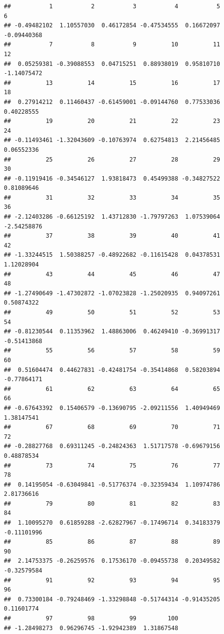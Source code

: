 \documentclass[
]{book}
\begin{document}
\begin{verbatim}
##           1           2           3           4           5           6 
## -0.49482102  1.10557030  0.46172854 -0.47534555  0.16672097 -0.09440368 
##           7           8           9          10          11          12 
##  0.05259381 -0.39088553  0.04715251  0.88938019  0.95810710 -1.14075472 
##          13          14          15          16          17          18 
##  0.27914212  0.11460437 -0.61459001 -0.09144760  0.77533036  0.40228555 
##          19          20          21          22          23          24 
## -0.11493461 -1.32043609 -0.10763974  0.62754813  2.21456485  0.06552336 
##          25          26          27          28          29          30 
## -0.11919416 -0.34546127  1.93818473  0.45499388 -0.34827522  0.81089646 
##          31          32          33          34          35          36 
## -2.12403286 -0.66125192  1.43712830 -1.79797263  1.07539064 -2.54258876 
##          37          38          39          40          41          42 
## -1.33244515  1.50388257 -0.48922682 -0.11615428  0.04378531  1.12028904 
##          43          44          45          46          47          48 
## -1.27490649 -1.47302872 -1.07023828 -1.25020935  0.94097261  0.50874322 
##          49          50          51          52          53          54 
## -0.81230544  0.11353962  1.48863006  0.46249410 -0.36991317 -0.51413868 
##          55          56          57          58          59          60 
##  0.51604474  0.44627831 -0.42481754 -0.35414868  0.58203894 -0.77864171 
##          61          62          63          64          65          66 
## -0.67643392  0.15406579 -0.13690795 -2.09211556  1.40949469  1.38147541 
##          67          68          69          70          71          72 
## -0.28827768  0.69311245 -0.24824363  1.51717578 -0.69679156  0.48878534 
##          73          74          75          76          77          78 
##  0.14195054 -0.63049841 -0.51776374 -0.32359434  1.10974786  2.81736616 
##          79          80          81          82          83          84 
##  1.10095270  0.61859288 -2.62827967 -0.17496714  0.34183379 -0.11101996 
##          85          86          87          88          89          90 
##  2.14753375 -0.26259576  0.17536170 -0.09455738  0.20349582 -0.32579584 
##          91          92          93          94          95          96 
##  0.73300184 -0.79248469 -1.33298848 -0.51744314 -0.91435205  0.11601774 
##          97          98          99         100 
## -1.28498273  0.96296745 -1.92942389  1.31867548
\end{verbatim}
\end{document}
